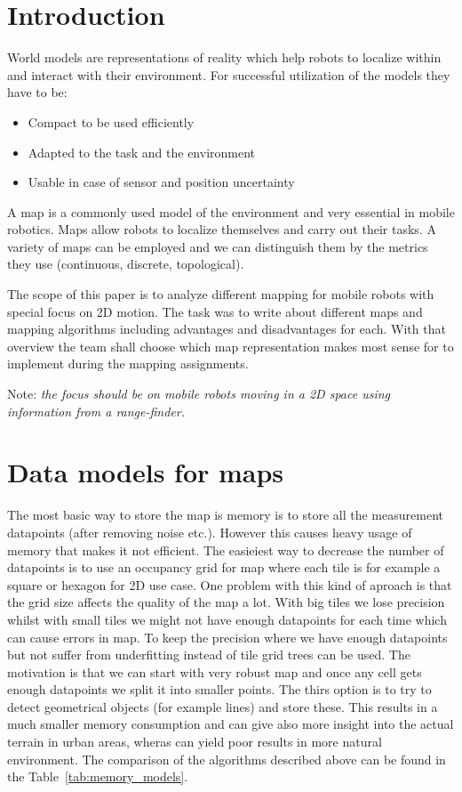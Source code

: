 \documentclass[12pt, a4paper, onecolumn]{article}
\begin{document}
\maketitle

\section{Introduction}
World models are representations of reality which help robots to localize within and interact with their environment. For successful utilization of the models they have to be:
\begin{itemize}
  \item Compact to be used efficiently
  \item Adapted to the task and the environment
  \item Usable in case of sensor and position uncertainty
  \end{itemize}
A map is a commonly used model of the environment and very essential in mobile robotics. Maps allow robots to localize themselves and carry out their tasks. A variety of maps can be employed and we can distinguish them by the metrics they use (continuous, discrete, topological).\par
The scope of this paper is to analyze different mapping for mobile robots with special focus on 2D motion. The task was to write about different maps and mapping algorithms including advantages and disadvantages for each. With that overview the team shall choose which map representation makes most sense for to implement during the mapping assignments. \par
Note: \emph{the focus should be on mobile robots moving in a 2D space using information from a range-finder.}

\section{Data models for maps}
The most basic way to store the map is memory is to store all the measurement datapoints (after removing noise etc.).
However this causes heavy usage of memory that makes it not efficient.
The easieiest way to decrease the number of datapoints is to use an occupancy grid for map where each tile is for example a square or hexagon for 2D use case.
One problem with this kind of aproach is that the grid size affects the quality of the map a lot.
With big tiles we lose precision whilst with small tiles we might not have enough datapoints for each time which can cause errors in map.
To keep the precision where we have enough datapoints but not suffer from underfitting instead of tile grid trees can be used.
The motivation is that we can start with very robust map and once any cell gets enough datapoints we split it into smaller points.
The thirs option is to try to detect geometrical objects (for example lines) and store these.
This results in a much smaller memory consumption and can give also more insight into the actual terrain in urban areas, wheras can yield poor results in more natural environment.
\cite{AlgorithmsForIndoorMapping}
The comparison of the algorithms described above can be found in the Table~\ref{tab:memory_models}.
\end{document}
